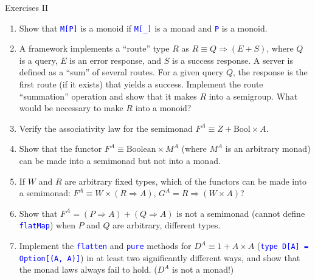 \documentclass[english]{beamer}
\begin{document}
\begin{frame}{Exercises II}
\begin{enumerate}
\item \vspace*{-0.2cm}Show that \texttt{\textcolor{blue}{\footnotesize{}M{[}P{]}}}
is a monoid if \texttt{\textcolor{blue}{\footnotesize{}M{[}\_{]}}}
is a monad and \texttt{\textcolor{blue}{\footnotesize{}P}} is a monoid.
\item A framework implements a ``route'' type $R$ as $R\equiv Q\Rightarrow\left(E+S\right)$,
where $Q$ is a query, $E$ is an error response, and $S$ is a success
response. A server is defined as a ``sum'' of several routes. For
a given query $Q$, the response is the first route (if it exists)
that yields a success. Implement the route ``summation'' operation
and show that it makes $R$ into a semigroup. What would be necessary
to make $R$ into a monoid?
\item Verify the associativity law for the semimonad $F^{A}\equiv Z+\text{Bool}\times A$.
\item Show that the functor $F^{A}\equiv\text{Boolean}\times M^{A}$ (where
$M^{A}$ is an arbitrary monad) can be made into a semimonad but not
into a monad.
\item If $W$ and $R$ are arbitrary fixed types, which of the functors
can be made into a semimonad: $F^{A}\equiv W\times\left(R\Rightarrow A\right)$,
$G^{A}=R\Rightarrow\left(W\times A\right)$?
\item Show that $F^{A}=\left(P\Rightarrow A\right)+\left(Q\Rightarrow A\right)$
is not a semimonad (cannot define \texttt{\textcolor{blue}{\footnotesize{}flatMap}})
when $P$ and $Q$ are arbitrary, different types.
\item Implement the \texttt{\textcolor{blue}{\footnotesize{}flatten}} and
\texttt{\textcolor{blue}{\footnotesize{}pure}} methods for $D^{A}\equiv1+A\times A$
(\texttt{\textcolor{blue}{\footnotesize{}type D{[}A{]} = Option{[}(A,
A){]}}}) in at least two significantly different ways, and show that
the monad laws always fail to hold. ($D^{A}$ is not a monad!)
\end{enumerate}
\end{frame}
\end{document}
